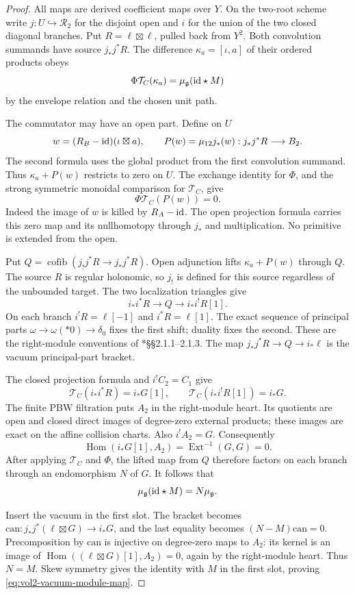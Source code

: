 \begin{proof}
All maps are derived coefficient maps over $Y$.
On the two-root scheme write $j:U\hookrightarrow\mathscr R_2$
for the disjoint open and $i$ for the union of the two closed
diagonal branches. Put $R=\ell\boxtimes\ell$, pulled back from
$Y^2$. Both convolution summands have source $j_*j^*R$.
The difference $\kappa_a=[\iota,a]$ of their ordered products obeys
\[
 \Phi\mathcal T_C(\kappa_a)
       =\mu_{\mathfrak g}(\mathrm{id}\star M)
\]
by the envelope relation and the chosen unit path.

The commutator may have an open part. Define on $U$
\[
 w=(R_B-\mathrm{id})(\iota\boxtimes a),\qquad
 P(w)=\mu_{12}j_*(w):j_*j^*R\longrightarrow B_2.
\]
The second formula uses the global product from the first
convolution summand. Thus $\kappa_a+P(w)$ restricts to zero on $U$.
The exchange identity for $\Phi$, and the strong symmetric
monoidal comparison for $\mathcal T_C$, give
\[
 \Phi\mathcal T_C(P(w))=0.
\]
Indeed the image of $w$ is killed by $R_A-\mathrm{id}$.
The open projection formula carries this zero map and its
nullhomotopy through $j_*$ and multiplication.
No primitive is extended from the open.

Put $Q=\operatorname{cofib}(j_!j^*R\to j_*j^*R)$.
Open adjunction lifts $\kappa_a+P(w)$ through $Q$.
The source $R$ is regular holonomic, so $j_!$ is defined for this
source regardless of the unbounded target.
The two localization triangles give
\[
 i_*i^*R\longrightarrow Q\longrightarrow i_*i^!R[1].
\]
On each branch $i^!R=\ell[-1]$ and $i^*R=\ell[1]$.
The exact sequence of principal parts
$\omega\to\omega(*0)\to\delta_0$ fixes the first shift;
duality fixes the second.
These are the right-module conventions of
\cite{BD04}*{\S\S2.1.1--2.1.3}.
The map $j_*j^*R\to Q\to i_*\ell$ is the vacuum
principal-part bracket.

The closed projection formula and $i^!C_2=C_1$ give
\[
 \mathcal T_C(i_*i^*R)=i_*G[1],\qquad
 \mathcal T_C(i_*i^!R[1])=i_*G.
\]
The finite PBW filtration puts $A_2$ in the right-module heart.
Its quotients are open and closed direct images of degree-zero
external products; these images are exact on the affine collision
charts. Also $i^!A_2=G$.
Consequently
\[
 \operatorname{Hom}(i_*G[1],A_2)
   =\operatorname{Ext}^{-1}(G,G)=0.
\]
After applying $\mathcal T_C$ and $\Phi$, the lifted map from $Q$
therefore factors on each branch through an endomorphism $N$ of $G$.
It follows that
\[
 \mu_{\mathfrak g}(\mathrm{id}\star M)=N\mu_{\mathfrak g}.
\]

Insert the vacuum in the first slot. The bracket becomes
$\mathrm{can}:j_*j^*(\ell\boxtimes G)\to i_*G$,
and the last equality becomes $(N-M)\mathrm{can}=0$.
Precomposition by $\mathrm{can}$ is injective on degree-zero
maps to $A_2$: its kernel is an image of
$\operatorname{Hom}((\ell\boxtimes G)[1],A_2)=0$,
again by the right-module heart.
Thus $N=M$. Skew symmetry gives the identity with $M$ in the
first slot, proving \eqref{eq:vol2-vacuum-module-map}.


\end{proof}

